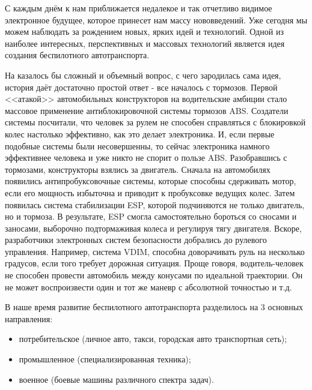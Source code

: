 
{\actuality} С каждым днём к нам приближается недалекое и так отчетливо видимое 
электронное будущее, которое принесет нам массу нововведений. Уже сегодня мы 
можем наблюдать за рождением новых, ярких идей и технологий. Одной из наиболее
интересных, перспективных и массовых технологий является идея создания 
беспилотного автотранспорта.


На казалось бы сложный и объемный вопрос, с чего зародилась сама идея, история 
даёт достаточно простой ответ - все началось с тормозов. Первой <<атакой>> 
автомобильных конструкторов на водительские амбиции стало массовое применение 
антиблокировочной системы тормозов ABS. Создатели системы посчитали, что 
человек за рулем не способен справляться с блокировкой колес настолько 
эффективно, как это делает электроника. И, если первые подобные системы были 
несовершенны, то сейчас электроника намного эффективнее человека и уже никто 
не спорит о пользе ABS. Разобравшись с тормозами, конструкторы взялись за 
двигатель. Сначала на автомобилях появились антипробуксовочные системы, 
которые способны сдерживать мотор, если его мощность избыточна и приводит 
к пробуксовке ведущих колес. Затем появилась система стабилизации ESP, 
которой подчиняются не только двигатель, но и тормоза. В результате, 
ESP смогла самостоятельно бороться со сносами и заносами, выборочно 
подтормаживая колеса и регулируя тягу двигателя. Вскоре, разработчики 
электронных систем безопасности добрались до рулевого управления. 
Например, система VDIM, 
способна доворачивать руль на несколько градусов, если того требует дорожная 
ситуация. Проще говоря, водитель-человек не способен провести автомобиль между 
конусами по идеальной траектории. Он не может воспроизвести один и тот же 
маневр с абсолютной точностью и т.д.

В наше время развитие беспилотного автотранспорта разделилось на 3 основных 
направления:

\begin{itemize}
    \item потребительское (личное авто, такси, городская авто транспортная сеть);
    \item промышленное (специализированная техника);
    \item военное (боевые машины различного спектра задач).
  \end{itemize}

